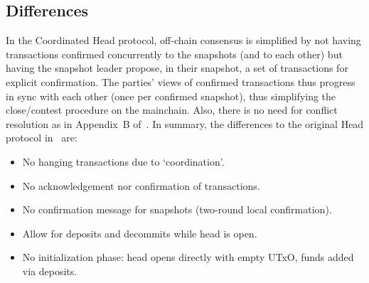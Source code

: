 \subsection{Differences}
In the Coordinated Head protocol, off-chain consensus is simplified by not
having transactions confirmed concurrently to the snapshots (and to each other)
but having the snapshot leader propose, in their snapshot, a set of transactions
for explicit confirmation. The parties' views of confirmed transactions thus
progress in sync with each other (once per confirmed snapshot), thus simplifying
the close/contest procedure on the mainchain. Also, there is no need for
conflict resolution as in Appendix~B of~\cite{hydrahead20}. In summary, the
differences to the original Head protocol in~\cite{hydrahead20} are:

\begin{itemize}
	\item No hanging transactions due to `coordination'.
	\item No acknowledgement nor confirmation of transactions.
	\item No confirmation message for snapshots (two-round local confirmation).
	\item Allow for deposits and decommits while head is open.
	\item No initialization phase: head opens directly with empty UTxO, funds added via deposits.
\end{itemize}

